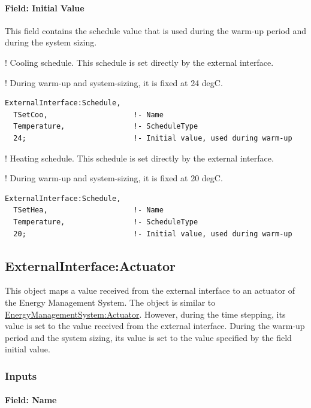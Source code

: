 \paragraph{Field: Initial Value}\label{field-initial-value}

This field contains the schedule value that is used during the warm-up period and during the system sizing.

! Cooling schedule. This schedule is set directly by the external interface.

! During warm-up and system-sizing, it is fixed at 24 degC.

\begin{lstlisting}
ExternalInterface:Schedule,
  TSetCoo,                    !- Name
  Temperature,                !- ScheduleType
  24;                         !- Initial value, used during warm-up
\end{lstlisting}

! Heating schedule. This schedule is set directly by the external interface.

! During warm-up and system-sizing, it is fixed at 20 degC.

\begin{lstlisting}
ExternalInterface:Schedule,
  TSetHea,                    !- Name
  Temperature,                !- ScheduleType
  20;                         !- Initial value, used during warm-up
\end{lstlisting}

\subsection{ExternalInterface:Actuator}\label{externalinterfaceactuator}

This object maps a value received from the external interface to an actuator of the Energy Management System. The object is similar to \hyperref[energymanagementsystemactuator]{EnergyManagementSystem:Actuator}. However, during the time stepping, its value is set to the value received from the external interface. During the warm-up period and the system sizing, its value is set to the value specified by the field initial value.

\subsubsection{Inputs}\label{inputs-2-015}

\paragraph{Field: Name}\label{field-name-2-014}

